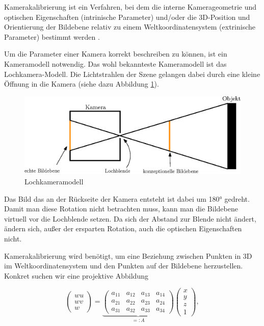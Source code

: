 \begin{definition}
	Kamerakalibrierung ist ein Verfahren, bei dem die interne Kamerageometrie und optischen Eigenschaften (intrinische Parameter) 
	und/oder die 3D-Position und Orientierung der Bildebene relativ zu einem Weltkoordinatensystem (extrinische Parameter) bestimmt werden \cite{Tsai1987}.
\end{definition}
\bigskip
Um die Parameter einer Kamera korrekt beschreiben zu können, ist ein Kameramodell notwendig. Das wohl bekannteste Kameramodell ist das Lochkamera-Modell. Die Lichtstrahlen der Szene gelangen dabei durch eine kleine Öffnung in die Kamera (siehe dazu Abbildung \ref{fig:pinhole}).
\begin{figure}[!htb]
	\centering
	\includegraphics[scale=.8]{images/pinhole2.eps}
	\caption{Lochkameramodell}
	\label{fig:pinhole}
\end{figure}

Das Bild das an der Rückseite der Kamera entsteht ist dabei um 180° gedreht. Damit man diese Rotation nicht betrachten muss, kann man die Bildebene virtuell vor die Lochblende setzen. Da sich der Abstand zur Blende nicht ändert, ändern sich, außer der ersparten Rotation, auch die optischen Eigenschaften nicht.

Kamerakalibrierung wird benötigt, um eine Beziehung zwischen Punkten in 3D im Weltkoordinatensystem und den Punkten auf der Bildebene herzustellen. Konkret suchen wir eine projektive Abbildung

\begin{equation}
	\begin{pmatrix}
	wu \\wv \\w 
	\end{pmatrix} = 
		\underbrace{\begin{pmatrix}
		a_{11} & a_{12} & a_{13} & a_{14} \\
		a_{21} & a_{22} & a_{23} & a_{24} \\
		a_{31} & a_{32} & a_{33} & a_{34} 
		\end{pmatrix}}_{=:A}	\begin{pmatrix}
		x \\y \\z \\ 1 
		\end{pmatrix},
\end{equation}


